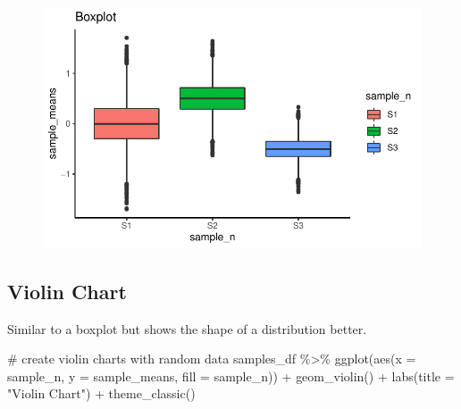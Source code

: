 \documentclass[
  letterpaper,
  DIV=11,
  numbers=noendperiod]{scrreprt}
\newenvironment{Shaded}{\begin{snugshade}}{\end{snugshade}}
\newcommand{\AttributeTok}[1]{\textcolor[rgb]{0.40,0.45,0.13}{#1}}
\newcommand{\CommentTok}[1]{\textcolor[rgb]{0.37,0.37,0.37}{#1}}
\newcommand{\FunctionTok}[1]{\textcolor[rgb]{0.28,0.35,0.67}{#1}}
\newcommand{\NormalTok}[1]{\textcolor[rgb]{0.00,0.23,0.31}{#1}}
\newcommand{\SpecialCharTok}[1]{\textcolor[rgb]{0.37,0.37,0.37}{#1}}
\newcommand{\StringTok}[1]{\textcolor[rgb]{0.13,0.47,0.30}{#1}}
\begin{document}
\begin{figure}[H]

{\centering \includegraphics{./visualizing-data_files/figure-pdf/unnamed-chunk-5-1.pdf}

}

\end{figure}

\hypertarget{violin-chart}{%
\subsection{Violin Chart}\label{violin-chart}}

Similar to a boxplot but shows the shape of a distribution better.

\begin{Shaded}
\begin{Highlighting}[]
\CommentTok{\# create violin charts with random data}
\NormalTok{samples\_df }\SpecialCharTok{\%\textgreater{}\%}
  \FunctionTok{ggplot}\NormalTok{(}\FunctionTok{aes}\NormalTok{(}\AttributeTok{x =}\NormalTok{ sample\_n, }\AttributeTok{y =}\NormalTok{ sample\_means, }\AttributeTok{fill =}\NormalTok{ sample\_n)) }\SpecialCharTok{+}
  \FunctionTok{geom\_violin}\NormalTok{() }\SpecialCharTok{+}
  \FunctionTok{labs}\NormalTok{(}\AttributeTok{title =} \StringTok{"Violin Chart"}\NormalTok{) }\SpecialCharTok{+}
  \FunctionTok{theme\_classic}\NormalTok{()}
\end{Highlighting}
\end{Shaded}
\end{document}
